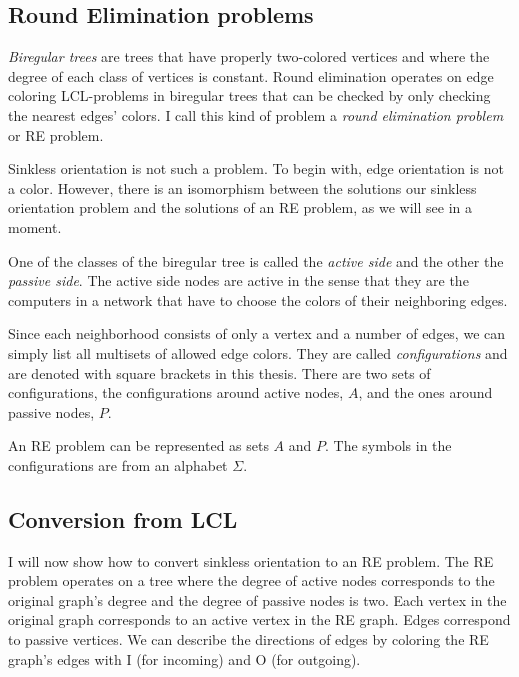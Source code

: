 \documentclass[english, 12pt, a4paper, sci, a-1b, online]{aaltothesis}
\begin{document}
\subsection{Round Elimination problems}

\emph{Biregular trees} are trees that have properly two-colored vertices and where the degree of each class of vertices is constant. Round elimination operates on edge coloring LCL-problems in biregular trees that can be checked by only checking the nearest edges' colors. I call this kind of problem a \emph{round elimination problem} or RE problem.

Sinkless orientation is not such a problem. To begin with, edge orientation is not a color. However, there is an isomorphism between the solutions our sinkless orientation problem and the solutions of an RE problem, as we will see in a moment.

One of the classes of the biregular tree is called the \emph{active side} and the other the \emph{passive side}. The active side nodes are active in the sense that they are the computers in a network that have to choose the colors of their neighboring edges.

Since each neighborhood consists of only a vertex and a number of edges, we can simply list all multisets of allowed edge colors. They are called \emph{configurations} and are denoted with square brackets in this thesis. There are two sets of configurations, the configurations around active nodes, $A$, and the ones around passive nodes, $P$.

An RE problem can be represented as sets $A$ and $P$. The symbols in the configurations are from an alphabet $\Sigma$.

\subsection{Conversion from LCL}

I will now show how to convert sinkless orientation to an RE problem. The RE problem operates on a tree where the degree of active nodes corresponds to the original graph's degree and the degree of passive nodes is two. Each vertex in the original graph corresponds to an active vertex in the RE graph. Edges correspond to passive vertices. We can describe the directions of edges by coloring the RE graph's edges with I (for incoming) and O (for outgoing).
\end{document}
